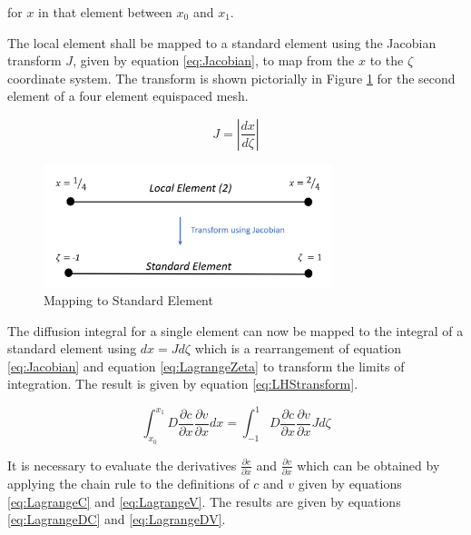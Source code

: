 \documentclass[11pt]{article}
\begin{document}
\hspace{10mm} for $x$ in that element between $x_0$ and $x_1$. \vspace{2mm}

The local element shall be mapped to a standard element using the Jacobian transform $J$, given by equation \ref{eq:Jacobian}, to map from the $x$ to the $\zeta$ coordinate system. The transform is shown pictorially in Figure \ref{fig:local2standard} for the second element of a four element equispaced mesh.


\begin{equation} \label{eq:Jacobian}
J = \left \vert \frac{dx}{d\zeta}\right \vert
\end{equation}



\begin{figure}[h!]
\centering
\includegraphics[width=0.75\textwidth]{Local2Standard.PNG}
\caption{Mapping to Standard Element}\label{fig:local2standard}
\end{figure}

\pagebreak

The diffusion integral for a single element can now be mapped to the integral of a standard element using $dx = Jd\zeta$ which is a rearrangement of equation \ref{eq:Jacobian} and equation \ref{eq:LagrangeZeta} to transform the limits of integration. The result is given by equation \ref{eq:LHStransform}.

\begin{equation}
\label{eq:LHStransform}
\int_{x_0}^{x_{1}} D \frac{\partial c}{\partial x}  \frac{\partial v}{\partial x}  dx =  \int_{-1}^{1} D \frac{\partial c}{\partial x}  \frac{\partial v}{\partial x} J d\zeta
\end{equation}

It is necessary to evaluate the derivatives $\frac{\partial c}{\partial x}$ and $ \frac{\partial v}{\partial x}$ which can be obtained by applying the chain rule to the definitions of $c$ and $v$ given by equations \ref{eq:LagrangeC} and \ref{eq:LagrangeV}. The results are given by equations \ref{eq:LagrangeDC} and \ref{eq:LagrangeDV}.
\end{document}
